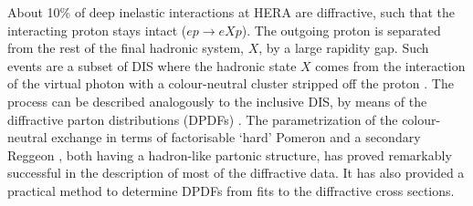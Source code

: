 \newcommand{\asotp}{\ensuremath{\frac{\alpha_{\rm s}}{2\pi}}}
\newcommand{\Sgl}[1]{\ensuremath{\tilde f_{#1+}}}
\newcommand{\Pom}{{I\!P}}
\newcommand{\Reg}{{I\!R}}
\newcommand{\xpom}{$x_{I\!P}$}
\newcommand{\xP}{x_\Pom}


About 10\% of deep inelastic interactions at HERA are diffractive, such that the interacting proton stays intact ($ep\to eXp$). 
The outgoing proton is separated from the rest of the final hadronic system, $X$, by a large rapidity gap.  
Such events are a subset of DIS where the hadronic state $X$ comes from the interaction of the
virtual photon with a colour-neutral cluster stripped off the proton \cite{Hebecker:1999vf}.
The process can be described analogously to the inclusive DIS, by means of the diffractive parton distributions 
(DPDFs) \cite{Collins:1997sr}.
The parametrization of the colour-neutral exchange in terms of factorisable `hard' Pomeron and a secondary 
Reggeon \cite{Ingelman:1984ns}, both having a hadron-like partonic structure, 
has proved remarkably successful in the description of most of the diffractive data.
It has also provided a practical method to determine DPDFs from fits to the diffractive cross sections.

%

